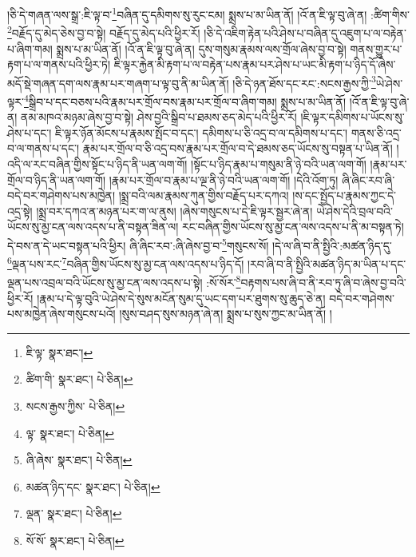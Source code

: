 །ཅི་དེ་གཞན་ལས་སྒྲ་:ཇི་ལྟ་བ་\footnote{ཇི་ལྟ་  སྣར་ཐང་། }བཞིན་དུ་དམིགས་སུ་རུང་ངམ། སྨྲས་པ་མ་ཡིན་ནོ། །འོ་ན་ཇི་ལྟ་བུ་ཞེ་ན། :ཚིག་གིས་\footnote{ཚིག་གི་  སྣར་ཐང་།  པེ་ཅིན། }བརྗོད་དུ་མེད་ཅེས་བྱ་བ་སྟེ། བརྗོད་དུ་མེད་པའི་ཕྱིར་རོ། །ཅི་དེ་འཇིག་རྟེན་པའི་ཤེས་པ་བཞིན་དུ་འཇུག་པ་ལ་བརྟེན་པ་ཞིག་གམ། སྨྲས་པ་མ་ཡིན་ནོ། །འོ་ན་ཇི་ལྟ་བུ་ཞེ་ན། དུས་གསུམ་རྣམས་ལས་གྲོལ་ཞེས་བྱ་བ་སྟེ། གནས་གྱུར་པ་རྟག་པ་ལ་གནས་པའི་ཕྱིར་ཏེ། ཇི་ལྟར་རྐྱེན་མི་རྟག་པ་ལ་བརྟེན་པས་རྣམ་པར་ཤེས་པ་ཡང་མི་རྟག་པ་ཉིད་དོ་ཞེས་མདོ་སྡེ་གཞན་དག་ལས་རྣམ་པར་གཞག་པ་ལྟ་བུ་ནི་མ་ཡིན་ནོ། །ཅི་དེ་ཉན་ཐོས་དང་རང་:སངས་རྒྱས་ཀྱི་\footnote{སངས་རྒྱས་ཀྱིས་  པེ་ཅིན། }ཡེ་ཤེས་ལྟར་\footnote{ལྟ་  སྣར་ཐང་།  པེ་ཅིན། }སྒྲིབ་པ་དང་བཅས་པའི་རྣམ་པར་གྲོལ་བས་རྣམ་པར་གྲོལ་བ་ཞིག་གམ། སྨྲས་པ་མ་ཡིན་ནོ། །འོ་ན་ཇི་ལྟ་བུ་ཞེ་ན། ནམ་མཁའ་མཉམ་ཞེས་བྱ་བ་སྟེ། ཤེས་བྱའི་སྒྲིབ་པ་ཐམས་ཅད་མེད་པའི་ཕྱིར་རོ། །ཇི་ལྟར་དམིགས་པ་ཡོངས་སུ་ཤེས་པ་དང་། ཇི་ལྟར་ཉོན་མོངས་པ་རྣམས་སྤོང་བ་དང་། དམིགས་པ་ཅི་འདྲ་བ་ལ་དམིགས་པ་དང་། གནས་ཅི་འདྲ་བ་ལ་གནས་པ་དང་། རྣམ་པར་གྲོལ་བ་ཅི་འདྲ་བས་རྣམ་པར་གྲོལ་བ་དེ་ཐམས་ཅད་ཡོངས་སུ་བསྟན་པ་ཡིན་ནོ། །འདི་ལ་རང་བཞིན་གྱིས་སྟོང་པ་ཉིད་ནི་ཡན་ལག་གོ། །སྟོང་པ་ཉིད་རྣམ་པ་གསུམ་ནི་ཉེ་བའི་ཡན་ལག་གོ། །རྣམ་པར་གྲོལ་བ་ཉིད་ནི་ཡན་ལག་གོ། །རྣམ་པར་གྲོལ་བ་རྣམ་པ་ལྔ་ནི་ཉེ་བའི་ཡན་ལག་གོ། །དེའི་འོག་ཏུ། ཞི་ཞིང་རབ་ཞི་བདེ་བར་གཤེགས་པས་མཁྱེན། །སྨྲ་བའི་ལམ་རྣམས་ཀུན་གྱིས་བརྗོད་པར་དཀའ། །ས་དང་སྤྱོད་པ་རྣམས་ཀྱང་དེ་འདྲ་སྟེ། །སྨྲ་བར་དཀའ་ན་མཉན་པར་ག་ལ་ནུས། །ཞེས་གསུངས་པ་དེ་ཇི་ལྟར་སྦྱར་ཞེ་ན། ཡེ་ཤེས་དེའི་བྲལ་བའི་ཡོངས་སུ་མྱ་ངན་ལས་འདས་པ་ནི་བསྟན་ཟིན་ལ། རང་བཞིན་གྱིས་ཡོངས་སུ་མྱ་ངན་ལས་འདས་པ་ནི་མ་བསྟན་ཏེ། དེ་བས་ན་དེ་ཡང་བསྟན་པའི་ཕྱིར། ཞི་ཞིང་རབ་:ཞི་ཞེས་བྱ་བ་\footnote{ཞི་ཞེས་  སྣར་ཐང་།  པེ་ཅིན། }གསུངས་སོ། །དེ་ལ་ཞི་བ་ནི་སྤྱིའི་:མཚན་ཉིད་དུ་\footnote{མཚན་ཉིད་དང་  སྣར་ཐང་།  པེ་ཅིན། }ལྡན་པས་རང་\footnote{ལྡན་  སྣར་ཐང་།  པེ་ཅིན། }བཞིན་གྱིས་ཡོངས་སུ་མྱ་ངན་ལས་འདས་པ་ཉིད་དོ། །རབ་ཞི་བ་ནི་སྤྱིའི་མཚན་ཉིད་མ་ཡིན་པ་དང་ལྡན་པས་འབྲལ་བའི་ཡོངས་སུ་མྱ་ངན་ལས་འདས་པ་སྟེ། :སོ་སོར་\footnote{སོ་སོ་  སྣར་ཐང་།  པེ་ཅིན། }བརྟགས་པས་ཞི་བ་ནི་རབ་ཏུ་ཞི་བ་ཞེས་བྱ་བའི་ཕྱིར་རོ། །རྣམ་པ་དེ་ལྟ་བུའི་ཡེ་ཤེས་དེ་སུས་མངོན་སུམ་དུ་ཡང་དག་པར་ཐུགས་སུ་ཆུད་ཅེ་ན། བདེ་བར་གཤེགས་པས་མཁྱེན་ཞེས་གསུངས་པའོ། །སུས་བཤད་སུས་མཉན་ཞེ་ན། སྨྲས་པ་སུས་ཀྱང་མ་ཡིན་ནོ། །
